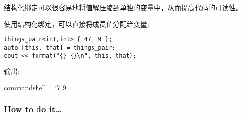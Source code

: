 
结构化绑定可以很容易地将值解压缩到单独的变量中，从而提高代码的可读性。

使用结构化绑定，可以直接将成员值分配给变量:

\begin{lstlisting}[style=styleCXX]
things_pair<int,int> { 47, 9 };
auto [this, that] = things_pair;
cout << format("{} {}\n", this, that);
\end{lstlisting}

输出:

\begin{tcblisting}{commandshell={}}
47 9
\end{tcblisting}

\subsubsection{How to do it…}

